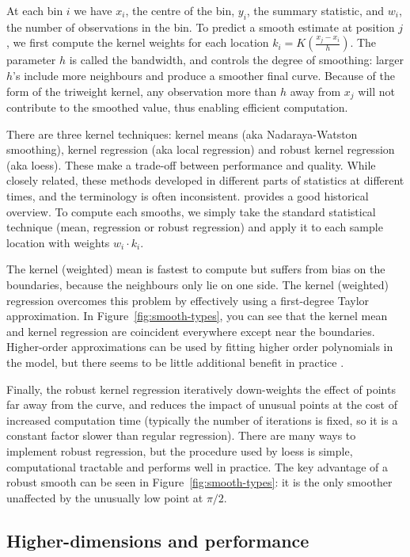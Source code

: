 \documentclass[journal]{vgtc}                %
\begin{document}
At each bin $i$ we have $x_i$, the centre of the bin, $y_i$, the summary statistic, and $w_i$, the number of observations in the bin. To predict a smooth estimate at position $j$, we first compute the kernel weights for each location $k_i = K(\frac{x_j - x_i}{h})$. The parameter $h$ is called the bandwidth, and controls the degree of smoothing: larger $h$'s include more neighbours and produce a smoother final curve. Because of the form of the triweight kernel, any observation more than $h$ away from $x_j$ will not contribute to the smoothed value, thus enabling efficient computation. 

There are three kernel techniques: kernel means (aka Nadaraya-Watston smoothing), kernel regression (aka local regression) and robust kernel regression (aka loess). These make a trade-off between performance and quality. While closely related, these methods developed in different parts of statistics at different times, and the terminology is often inconsistent. \citep{cleveland:1996} provides a good historical overview. To compute each smooths, we simply take the standard statistical technique (mean, regression or robust regression) and apply it to each sample location with weights $w_i \cdot k_i$. 

The kernel (weighted) mean is fastest to compute but suffers from bias on the boundaries, because the neighbours only lie on one side. The kernel (weighted) regression overcomes this problem by effectively using a first-degree Taylor approximation. In Figure~\ref{fig:smooth-types}, you can see that the kernel mean and kernel regression are coincident everywhere except near the boundaries. Higher-order approximations can be used by fitting higher order polynomials in the model, but there seems to be little additional benefit in practice \citep{cleveland:1996}.

Finally, the robust kernel regression iteratively down-weights the effect of points far away from the curve, and reduces the impact of unusual points at the cost of increased computation time (typically the number of iterations is fixed, so it is a constant factor slower than regular regression). There are many ways to implement robust regression, but the procedure used by loess \citep{cleveland:1979} is simple, computational tractable and performs well in practice. The key advantage of a robust smooth can be seen in Figure~\ref{fig:smooth-types}: it is the only smoother unaffected by the unusually low point at $\pi / 2$.

\subsection{Higher-dimensions and performance}
\end{document}
